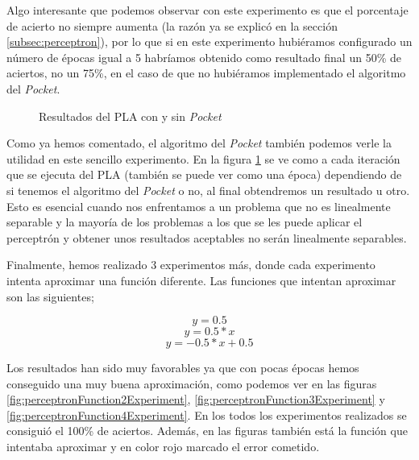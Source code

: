 \newpage
Algo interesante que podemos observar con este experimento es que el porcentaje de acierto no siempre aumenta (la razón ya se explicó en la sección \ref{subsec:perceptron}), por lo que si en este experimento hubiéramos configurado un número de épocas igual a 5 habríamos obtenido como resultado final un 50\% de aciertos, no un 75\%, en el caso de que no hubiéramos implementado el algoritmo del \textit{Pocket}.

\begin{figure}[H]
\centering
\caption{Resultados del PLA con y sin \textit{Pocket}}
\label{plot:perceptronResultsWithAndWithoutPocket}
\end{figure}

Como ya hemos comentado, el algoritmo del \textit{Pocket} también podemos verle la utilidad en este sencillo experimento. En la figura \ref{plot:perceptronResultsWithAndWithoutPocket} se ve como a cada iteración que se ejecuta del PLA (también se puede ver como una época) dependiendo de si tenemos el algoritmo del \textit{Pocket} o no, al final obtendremos un resultado u otro. Esto es esencial cuando nos enfrentamos a un problema que no es linealmente separable y la mayoría de los problemas a los que se les puede aplicar el perceptrón y obtener unos resultados aceptables no serán linealmente separables.

\newpage
Finalmente, hemos realizado 3 experimentos más, donde cada experimento intenta aproximar una función diferente. Las funciones que intentan aproximar son las siguientes;

\[y=0.5\]
\[y=0.5*x\]
\[y=-0.5*x+0.5\]

Los resultados han sido muy favorables ya que con pocas épocas hemos conseguido una muy buena aproximación, como podemos ver en las figuras \ref{fig:perceptronFunction2Experiment}, \ref{fig:perceptronFunction3Experiment} y \ref{fig:perceptronFunction4Experiment}. En los todos los experimentos realizados se consiguió el 100\% de aciertos. Además, en las figuras también está la función que intentaba aproximar y en color rojo marcado el error cometido.


